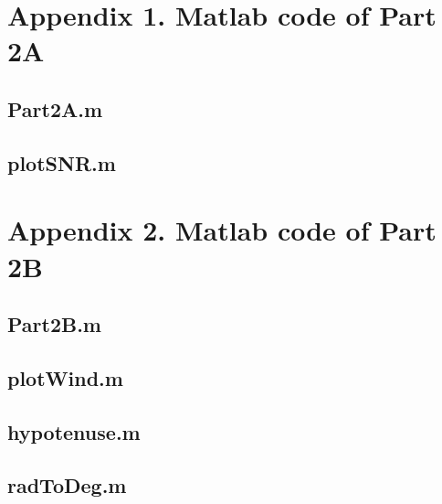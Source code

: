 \documentclass{article}
\begin{document}
\newpage
\section*{Appendix 1. Matlab code of Part 2A}

\subsection*{Part2A.m}


\subsection*{plotSNR.m}


\newpage
\section*{Appendix 2. Matlab code of Part 2B}

\subsection*{Part2B.m}


\subsection*{plotWind.m}


\subsection*{hypotenuse.m}


\subsection*{radToDeg.m}


\newpage
\end{document}
